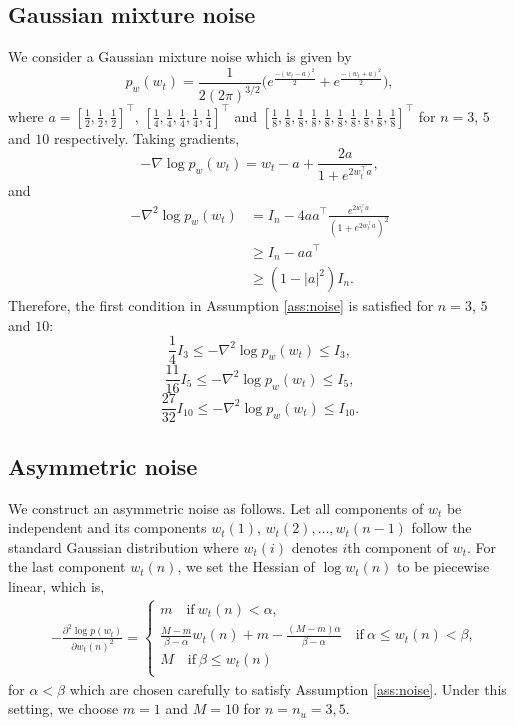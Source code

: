 \documentclass[11pt]{article}
\theoremstyle{plain}
\theoremstyle{definition}
\theoremstyle{remark}
\begin{document}
\subsection{Gaussian mixture noise}    \label{app:gm}
We consider a Gaussian mixture noise which is given by
\begin{equation*}
    p_w(w_t) = \frac{1}{2(2\pi)^{3/2}}\Big(e^{\frac{-(w_t-a)^2}{2}}+e^{\frac{-(w_t+a)^2}{2}}\Big ),
\end{equation*}
where $a = [\frac{1}{2},\frac{1}{2},\frac{1}{2}]^{\top}$, $[\frac{1}{4},\frac{1}{4},\frac{1}{4},\frac{1}{4},\frac{1}{4}]^{\top}$ and $[\frac{1}{8},\frac{1}{8},\frac{1}{8},\frac{1}{8},\frac{1}{8},\frac{1}{8},\frac{1}{8},\frac{1}{8},\frac{1}{8},\frac{1}{8}]^{\top}$ for $n=3$, $5$ and $10$ respectively.
Taking gradients,
\[
-\nabla \log p_w(w_t) = w_t -a + \frac{2a}{1+e^{2w_t^{\top}a}},
\]
and
\begin{equation*}
    \begin{split}
        -\nabla^2 \log p_w(w_t) &= I_n - 4aa^{\top} \frac{e^{2w_t^{\top}a}}{(1+e^{2w_t^{\top}a})^2}\\
        &\geq I_n-aa^{\top}\\
        &\geq (1-|a|^2)I_n.
    \end{split}
\end{equation*}
Therefore, the first condition in Assumption \ref{ass:noise} is satisfied for $n=3$, $5$ and $10$:
\[
\frac{1}{4}I_3\leq -\nabla^2 \log p_w(w_t)\leq I_3,
\]
\[
\frac{11}{16}I_5\leq -\nabla^2 \log p_w(w_t)\leq I_5,
\]
\[
\frac{27}{32}I_{10}\leq -\nabla^2 \log p_w(w_t)\leq I_{10}.
\]
 
 
\subsection{Asymmetric noise}\label{app:asy}
We construct an asymmetric noise  as follows. Let all components of $w_t$ be independent and its components $w_t(1)$, $w_t(2),\ldots, w_t(n-1)$ follow the standard Gaussian distribution where $w_t(i)$ denotes $i$th component of $w_t$. For the last component $w_t(n)$, we set the Hessian of $\log w_t(n) $ to be piecewise linear, which is,
\begin{align*} 
&-\frac{\partial^2 \log p(w_t) }{\partial w_t(n)^2}=
\begin{cases}
m \quad \mbox{if} \ w_t(n)<\alpha,\\
\frac{M-m}{\beta-\alpha}w_t(n)+m-\frac{(M-m)\alpha}{\beta-\alpha} \quad \mbox{if} \ \alpha \leq w_t(n)<\beta,\\
M \quad \mbox{if} \ \beta \leq w_t(n)\\
\end{cases}
\end{align*}
for $\alpha<\beta$ which are chosen carefully to satisfy Assumption \ref{ass:noise}. Under this setting, we choose $m=1$ and $M=10$ for $n=n_u=3,5$. 
\end{document}
